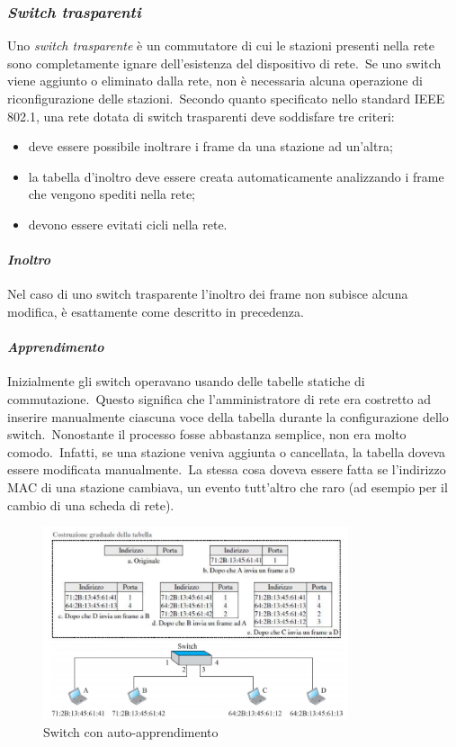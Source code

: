 \subsubsection{\emph{Switch trasparenti}}

Uno \emph{switch trasparente} è un commutatore di cui le stazioni presenti nella rete sono completamente ignare dell'esistenza del dispositivo di rete.\
Se uno switch viene aggiunto o eliminato dalla rete, non è necessaria alcuna operazione di riconfigurazione delle stazioni.\
Secondo quanto specificato nello standard IEEE 802.1, una rete dotata di switch trasparenti deve soddisfare tre criteri:
\begin{itemize}
    \item deve essere possibile inoltrare i frame da una stazione ad un'altra;
    \item la tabella d'inoltro deve essere creata automaticamente analizzando i frame che vengono spediti nella rete;
    \item devono essere evitati cicli nella rete.
\end{itemize}

\paragraph{\emph{Inoltro}}

Nel caso di uno switch trasparente l'inoltro dei frame non subisce alcuna modifica, è esattamente come descritto in precedenza.

\paragraph{\emph{Apprendimento}}

Inizialmente gli switch operavano usando delle tabelle statiche di commutazione.\
Questo significa che l'amministratore di rete era costretto ad inserire manualmente ciascuna voce della tabella durante la configurazione dello switch.\
Nonostante il processo fosse abbastanza semplice, non era molto comodo.\
Infatti, se una stazione veniva aggiunta o cancellata, la tabella doveva essere modificata manualmente.\
La stessa cosa doveva essere fatta se l'indirizzo MAC di una stazione cambiava, un evento tutt'altro che raro (ad esempio per il cambio di una scheda di rete).
\begin{figure}[H]
    \centering
    \includegraphics[width=0.8\textwidth]{immagini/Switch_autoapprendimento.png}
    \caption{Switch con auto-apprendimento}
    \label{fig:Auto-apprendimento}
\end{figure}

